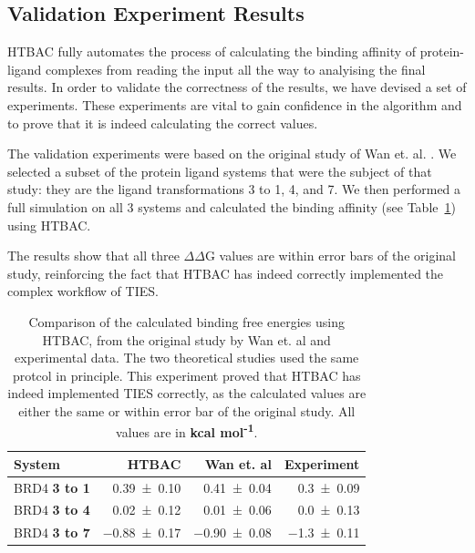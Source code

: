 

\subsection{Validation Experiment Results}

HTBAC fully automates the process of calculating the binding affinity of
protein-ligand complexes from reading the input all the way to analyising the
final results. In order to validate the correctness of the results, we have
devised a set of experiments. These experiments are vital to gain confidence
in the algorithm and to prove that it is indeed calculating the correct values.

The validation experiments were based on the original study of Wan et. al.
\cite{Wan2017brd4}. We selected a subset of the protein ligand systems that
were the subject of that study: they are the ligand transformations 3 to 1, 4,
and 7. We then performed a full simulation on all 3 systems and calculated the
binding affinity (see Table~\ref{tab:exp2}) using HTBAC.

The results show that all three $\Delta \Delta$G values are within error bars
of the original study, reinforcing the fact that HTBAC has indeed correctly
implemented the complex workflow of TIES.

\begin{table}
  \centering
  \begin{tabular}{l@{\hskip 1in}r@{\hskip 0.2in}r@{\hskip 0.2in}r}
    \toprule
    System & HTBAC & Wan et. al & Experiment \\
    \midrule
    BRD4 \textbf{3 to 1} & \num{0.39 +- 0.10} &   \num{0.41 +- 0.04} &  \num{0.3 +- 0.09} \\
    BRD4 \textbf{3 to 4} & \num{0.02 +- 0.12} &   \num{0.01 +- 0.06} &  \num{0.0 +- 0.13} \\
    BRD4 \textbf{3 to 7} & \num{-0.88 +- 0.17} &  \num{-0.90 +- 0.08} & \num{-1.3 +- 0.11} \\
    \bottomrule
  \end{tabular}

  \caption{Comparison of the calculated binding free energies using HTBAC, from
  the original study by Wan et. al and experimental data. The two theoretical
  studies used the same protcol in principle. This experiment proved that HTBAC
  has indeed implemented TIES correctly, as the calculated values are either
  the same or within error bar of the original study. All values are in
  \textbf{kcal mol\textsuperscript{-1}}.}
  \label{tab:exp2}


\end{table}

